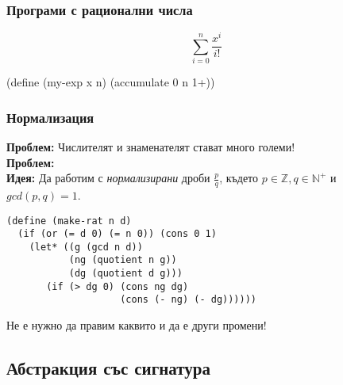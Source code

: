 \documentclass{beamer}
\begin{document}
\begin{frame}[fragile]
  \frametitle{Програми с рационални числа}

  \begin{equation*}
    \sum_{i=0}^n \frac{x^i}{i!}
  \end{equation*}

  \onslide<+->

  \begin{overprint}
\begin{semiverbatim}
(define (my-exp x n)
  (accumulate   0 n
               1+))
\end{semiverbatim}
  \end{overprint}
\end{frame}

\begin{frame}[fragile]
  \frametitle{Нормализация}

  \textbf{Проблем:} Числителят и знаменателят стават много големи!\\[1em]
  \pause
  \textbf{Проблем:} \\[1em]
  \pause
  \textbf{Идея:} Да работим с \emph{нормализирани} дроби $\frac p q$, където $p \in \mathbb Z, q \in \mathbb N^+$ и $gcd(p,q) = 1$.
  \pause
\begin{lstlisting}
(define (make-rat n d)
  (if (or (= d 0) (= n 0)) (cons 0 1)
    (let* ((g (gcd n d))
           (ng (quotient n g))
           (dg (quotient d g)))
       (if (> dg 0) (cons ng dg)
                    (cons (- ng) (- dg))))))
\end{lstlisting}
  \pause
  \alert{Не е нужно да правим каквито и да е други промени!}
\end{frame}

\subsection{Абстракция със сигнатура}
\end{document}
